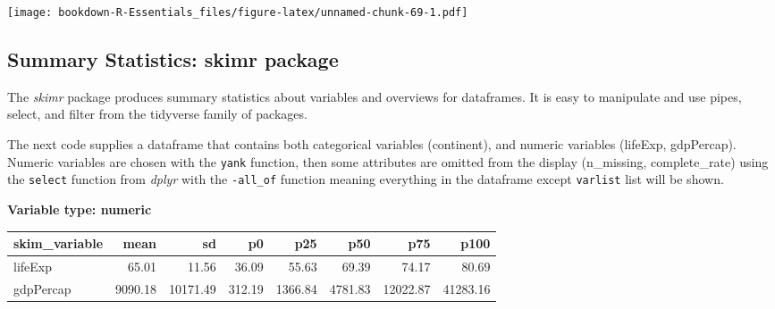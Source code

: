 \documentclass[
]{book}
\newenvironment{Shaded}{\begin{snugshade}}{\end{snugshade}}
\newcommand{\DecValTok}[1]{\textcolor[rgb]{0.00,0.00,0.81}{#1}}
\newcommand{\KeywordTok}[1]{\textcolor[rgb]{0.13,0.29,0.53}{\textbf{#1}}}
\newcommand{\NormalTok}[1]{#1}
\newcommand{\OperatorTok}[1]{\textcolor[rgb]{0.81,0.36,0.00}{\textbf{#1}}}
\newcommand{\StringTok}[1]{\textcolor[rgb]{0.31,0.60,0.02}{#1}}
\begin{document}
\texttt{[image: bookdown-R-Essentials\_files/figure-latex/unnamed-chunk-69-1.pdf]}

\hypertarget{summary-statistics-skimr-package}{%
\subsection{Summary Statistics: skimr package}\label{summary-statistics-skimr-package}}

The \emph{skimr} package produces summary statistics about variables and overviews for dataframes. It is easy to manipulate and use pipes, select, and filter from the tidyverse family of packages.

The next code supplies a dataframe that contains both categorical variables (continent), and numeric variables (lifeExp, gdpPercap). Numeric variables are chosen with the \texttt{yank} function, then some attributes are omitted from the display (n\_missing, complete\_rate) using the \texttt{select} function from \emph{dplyr} with the \texttt{-all\_of} function meaning everything in the dataframe except \texttt{varlist} list will be shown.

\begin{Shaded}
\end{Shaded}

\textbf{Variable type: numeric}

\begin{tabular}{l|r|r|r|r|r|r|r}
\hline
skim\_variable & mean & sd & p0 & p25 & p50 & p75 & p100\\
\hline
lifeExp & 65.01 & 11.56 & 36.09 & 55.63 & 69.39 & 74.17 & 80.69\\
\hline
gdpPercap & 9090.18 & 10171.49 & 312.19 & 1366.84 & 4781.83 & 12022.87 & 41283.16\\
\hline
\end{tabular}
\end{document}

